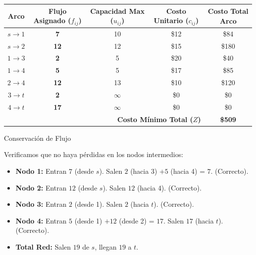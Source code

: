 \documentclass[10pt,a4paper]{article}
\begin{document}
\begin{table}[h!]
\centering
\begin{tabular}{ccccc}
\hline
\textbf{Arco} & \textbf{Flujo Asignado ($f_{ij}$)} & \textbf{Capacidad Max ($u_{ij}$)} & \textbf{Costo Unitario ($c_{ij}$)} & \textbf{Costo Total Arco} \\
\hline
$s \to 1$ & \textbf{7} & 10 & \$12 & \$84 \\
$s \to 2$ & \textbf{12} & 12 & \$15 & \$180 \\
$1 \to 3$ & \textbf{2} & 5 & \$20 & \$40 \\
$1 \to 4$ & \textbf{5} & 5 & \$17 & \$85 \\
$2 \to 4$ & \textbf{12} & 13 & \$10 & \$120 \\
$3 \to t$ & \textbf{2} & $\infty$ & \$0 & \$0 \\
$4 \to t$ & \textbf{17} & $\infty$ & \$0 & \$0 \\
\hline
\multicolumn{4}{r}{\textbf{Costo Mínimo Total ($Z$)}} & \textbf{\$509} \\
\hline
\end{tabular}
\end{table}


\begin{alerta}{Conservación de Flujo}

Verificamos que no haya pérdidas en los nodos intermedios:

\begin{itemize}
    \item \textbf{Nodo 1:} Entran $7$ (desde $s$). Salen $2$ (hacia 3) $+ 5$ (hacia 4) = $7$. (Correcto).
    \item \textbf{Nodo 2:} Entran $12$ (desde $s$). Salen $12$ (hacia 4). (Correcto).
    \item \textbf{Nodo 3:} Entran $2$ (desde 1). Salen $2$ (hacia $t$). (Correcto).
    \item \textbf{Nodo 4:} Entran $5$ (desde 1) $+ 12$ (desde 2) = $17$. Salen $17$ (hacia $t$). (Correcto).
    \item \textbf{Total Red:} Salen $19$ de $s$, llegan $19$ a $t$.
\end{itemize}
\end{alerta}
\end{document}

